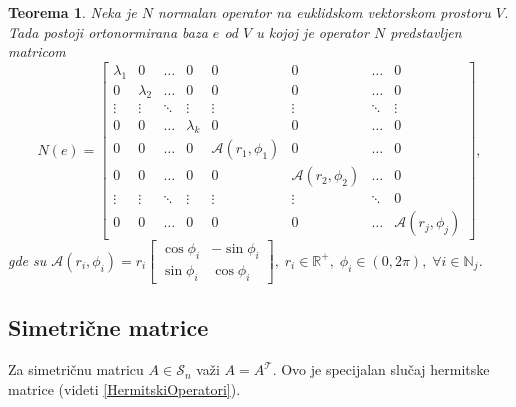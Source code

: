 \documentclass[a4paper,12pt,twoside]{report}
\newtheorem{theorem}{Teorema}[section]
\numberwithin{algorithm}{section}
\begin{document}
\begin{theorem}
    Neka je $N$ normalan operator na euklidskom vektorskom prostoru $V$. Tada postoji ortonormirana baza $e$ od $V$ u kojoj 
    je operator $N$ predstavljen matricom
    \[ N(e) = \begin{bmatrix}
        \lambda_1 & 0 & \dots & 0 & 0 & 0 & \dots & 0 \\
        0 & \lambda_2 & \dots & 0 & 0 & 0 & \dots & 0 \\
        \vdots & \vdots & \ddots & \vdots & \vdots & \vdots & \ddots & \vdots \\
        0 & 0 & \dots & \lambda_k & 0 & 0 & \dots & 0 \\
        0 & 0 & \dots & 0 & \mathcal{A}(r_1, \phi_1) & 0 & \dots & 0 \\
        0 & 0 & \dots & 0 & 0 & \mathcal{A}(r_2, \phi_2) & \dots & 0 \\
        \vdots & \vdots & \ddots & \vdots & \vdots & \vdots & \ddots & 0 \\
        0 & 0 & \dots & 0 & 0 & 0 & \dots & \mathcal{A}(r_j, \phi_j)
    \end{bmatrix}, \] gde su $\mathcal{A}(r_i, \phi_i) = r_i \begin{bmatrix}
        \cos \phi_i & -\sin \phi_i \\
        \sin \phi_i & \cos \phi_i
    \end{bmatrix}, \; r_i \in \mathbb{R}^+, \;\phi_i \in (0, 2\pi), \; \forall i \in \mathbb{N}_j $.
\end{theorem}

\newpage

\subsection{Simetrične matrice}
\label{SimetricneMatrice}
Za simetričnu matricu $A \in \mathcal{S}_n$ važi $A = A^\mathcal{T}$. Ovo je specijalan slučaj hermitske matrice (videti \ref{HermitskiOperatori}).
\end{document}
